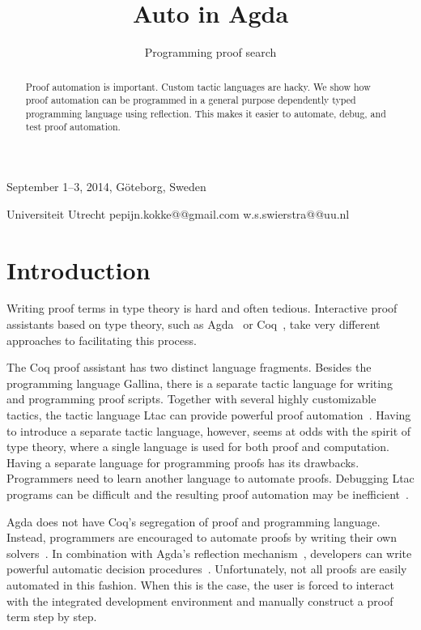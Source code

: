 \documentclass[preprint]{sigplanconf}
\begin{document}
 {September 1--3, 2014, G\"oteborg, Sweden}

\title{Auto in Agda}
\subtitle{Programming proof search}

           {Universiteit Utrecht}
           {pepijn.kokke@@gmail.com \quad w.s.swierstra@@uu.nl}

\maketitle


\begin{abstract}
  Proof automation is important. Custom tactic languages are hacky. We
  show how proof automation can be programmed in a general purpose
  dependently typed programming language using reflection. This makes
  it easier to automate, debug, and test proof automation.
\end{abstract}

\section{Introduction}
\label{sec:intro}

Writing proof terms in type theory is hard and often tedious.
Interactive proof assistants based on type theory, such as
Agda~\cite{agda} or Coq~\cite{coq}, take very different approaches to
facilitating this process.

The Coq proof assistant has two distinct language fragments. Besides
the programming language Gallina, there is a separate tactic language
for writing and programming proof scripts. Together with several
highly customizable tactics, the tactic language Ltac can provide
powerful proof automation~\cite{chlipala}. Having to introduce a
separate tactic language, however, seems at odds with the spirit of
type theory, where a single language is used for both proof and
computation.  Having a separate language for programming proofs has
its drawbacks. Programmers need to learn another language to automate
proofs. Debugging Ltac programs can be difficult and the resulting
proof automation may be inefficient~\cite{brabaint}.

Agda does not have Coq's segregation of proof and programming
language.  Instead, programmers are encouraged to automate proofs by
writing their own solvers~\cite{ulf-tphols}. In combination with
Agda's reflection mechanism~\cite{van-der-walt}, developers can write
powerful automatic decision procedures~\cite{allais}. Unfortunately,
not all proofs are easily automated in this fashion. When this is the
case, the user is forced to interact with the integrated development
environment and manually construct a proof term step by step.
\end{document}
